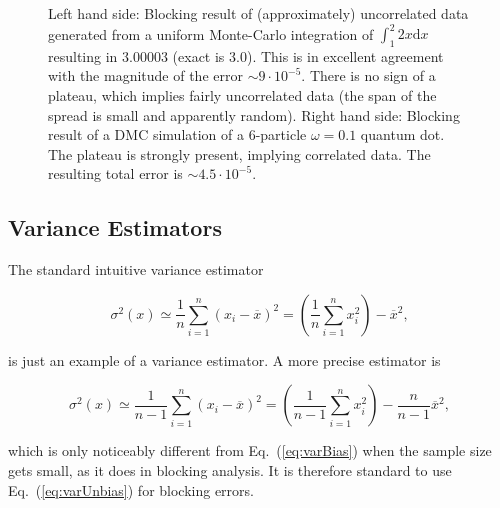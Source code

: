 \begin{figure}
\begin{center}
  \caption{Left hand side: Blocking result of (approximately) uncorrelated data generated from a uniform Monte-Carlo integration of $\int _1^2 2x\mathrm{d}x$ resulting in $3.00003$ (exact is $3.0$). This is in excellent agreement with the magnitude of the error $\sim 9\cdot 10^{-5}$. There is no sign of a plateau, which implies fairly uncorrelated data (the span of the spread is small and apparently random). Right hand side: Blocking result of a DMC simulation of a 6-particle $\omega=0.1$ quantum dot. The plateau is strongly present, implying correlated data. The resulting total error is  $\sim 4.5\cdot 10^{-5}$.}
  \label{FIG:BlockingExamples}
 \end{center}
\end{figure}


\subsection{Variance Estimators}

The standard intuitive variance estimator

\begin{equation}
\label{eq:varBias}
 \sigma^2(x) \simeq \frac{1}{n}\sum_{i=1}^n (x_i - \overline{x})^2 = \left(\frac{1}{n}\sum_{i=1}^n x_i^2\right) - \overline{x}^2,
\end{equation}

is just an example of a variance estimator. A more precise estimator is 

\begin{equation}
\label{eq:varUnbias}
 \sigma^2(x) \simeq \frac{1}{n-1}\sum_{i=1}^n (x_i - \overline{x})^2 = \left(\frac{1}{n-1}\sum_{i=1}^n x_i^2\right) - \frac{n}{n-1}\overline{x}^2,
\end{equation}

which is only noticeably different from Eq.~(\ref{eq:varBias}) when the sample size gets small, as it does in blocking analysis. It is therefore standard to use Eq.~(\ref{eq:varUnbias}) for blocking errors.


